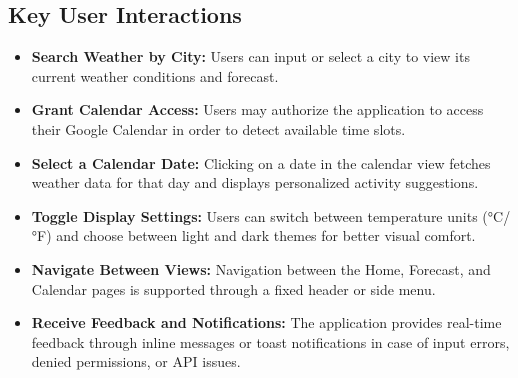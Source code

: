 \documentclass[fontsize=13pt,a4paper]{scrartcl}
\begin{document}
\newpage

\subsection{Key User Interactions}
\begin{itemize}[nosep]
  \item \textbf{Search Weather by City:} Users can input or select a city to view its current weather conditions and forecast.
  \item \textbf{Grant Calendar Access:} Users may authorize the application to access their Google Calendar in order to detect available time slots.
  \item \textbf{Select a Calendar Date:} Clicking on a date in the calendar view fetches weather data for that day and displays personalized activity suggestions.
  \item \textbf{Toggle Display Settings:} Users can switch between temperature units (°C/°F) and choose between light and dark themes for better visual comfort.
  \item \textbf{Navigate Between Views:} Navigation between the Home, Forecast, and Calendar pages is supported through a fixed header or side menu.
  \item \textbf{Receive Feedback and Notifications:} The application provides real-time feedback through inline messages or toast notifications in case of input errors, denied permissions, or API issues.
\end{itemize}
\end{document}
